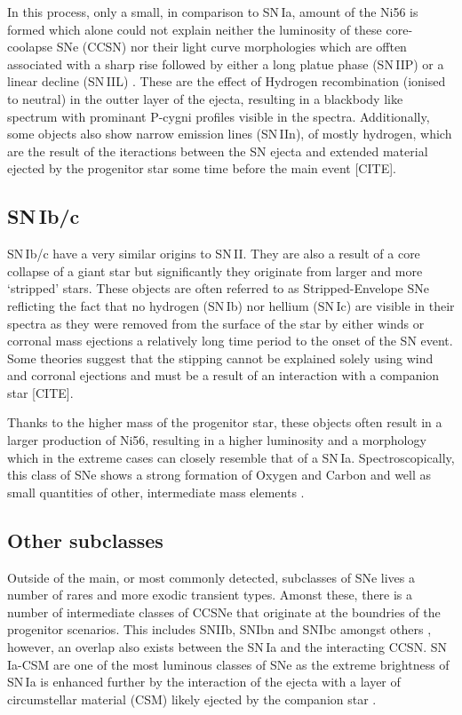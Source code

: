 In this process, only a small, in comparison to SN\,Ia, amount of the Ni56 is formed which alone could not explain neither the luminosity of these core-coolapse SNe (CCSN) nor their light curve morphologies which are offten associated with a sharp rise followed by either a long platue phase (SN\,IIP) or a linear decline (SN\,IIL) \citep{Alsabti2017}. These are the effect of Hydrogen recombination (ionised to neutral) in the outter layer of the ejecta, resulting in a blackbody like spectrum with prominant P-cygni profiles visible in the spectra. Additionally, some objects also show narrow emission lines (SN\,IIn), of mostly hydrogen, which are the result of the iteractions between the SN ejecta and extended material ejected by the progenitor star some time before the main event [CITE].

\subsection{SN\,Ib/c}
SN\,Ib/c have a very similar origins to SN\,II. They are also a result of a core collapse of a giant star but significantly they originate from larger and more `stripped' stars. These objects are often referred to as Stripped-Envelope SNe reflicting the fact that no hydrogen (SN\,Ib) nor hellium (SN\,Ic) are visible in their spectra as they were removed from the surface of the star by either winds or corronal mass ejections a relatively long time period to the onset of the SN event. Some theories suggest that the stipping cannot be explained solely using wind and corronal ejections and must be a result of an interaction with a companion star [CITE].

Thanks to the higher mass of the progenitor star, these objects often result in a larger production of Ni56, resulting in a higher luminosity and a morphology which in the extreme cases can closely resemble that of a SN\,Ia. Spectroscopically, this class of SNe shows a strong formation of Oxygen and Carbon and well as small quantities of other, intermediate mass elements \citep{Filippenko1997}.

\subsection{Other subclasses}
Outside of the main, or most commonly detected, subclasses of SNe lives a number of rares and more exodic transient types. Amonst these, there is a number of intermediate classes of CCSNe that originate at the boundries of the progenitor scenarios. This includes SNIIb, SNIbn and SNIbc amongst others \citep{Alsabti2017}, however, an overlap also exists between the SN\,Ia and the interacting CCSN. SN\,Ia-CSM are one of the most luminous classes of SNe as the extreme brightness of SN\,Ia is enhanced further by the interaction of the ejecta with a layer of circumstellar material (CSM) likely ejected by the companion star \citep{Dilday2012}.

